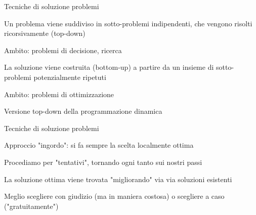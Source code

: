 \begin{frame}{Tecniche di soluzione problemi}

\vspace{-9pt}
\begin{myboxtitle}
\BI
\item Un problema viene suddiviso in sotto-problemi indipendenti, che vengono
risolti ricorsivamente (top-down)
\item Ambito: problemi di decisione, ricerca
\EI
\end{myboxtitle}

\begin{myboxtitle}
\BI
\item La soluzione viene costruita (bottom-up) a partire da un insieme di
sotto-problemi potenzialmente ripetuti
\item Ambito: problemi di ottimizzazione
\EI
\end{myboxtitle}
\begin{myboxtitle}
\BI
\item Versione top-down della programmazione dinamica
\EI
\end{myboxtitle}


\end{frame}

\begin{frame}{Tecniche di soluzione problemi}

\vspace{-9pt}
\begin{myboxtitle}
\BI
\item Approccio "ingordo": si fa sempre la scelta localmente ottima
\EI
\end{myboxtitle}

\begin{myboxtitle}[Backtrack]
\BI
\item Procediamo per "tentativi", tornando ogni tanto sui nostri passi
\EI
\end{myboxtitle}

\begin{myboxtitle}
\BI
\item La soluzione ottima viene trovata "migliorando" via via soluzioni esistenti
\EI
\end{myboxtitle}

\begin{myboxtitle}
\BI
\item Meglio scegliere con giudizio (ma in maniera costosa) o scegliere a caso ("gratuitamente")
\EI
\end{myboxtitle}

\end{frame}

